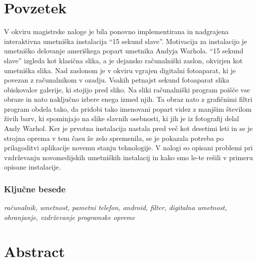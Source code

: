 \documentclass[a4paper, 12pt]{book}
\begin{document}
	
\chapter{Povzetek}

V okviru magistrske naloge je bila ponovno implementirana in nadgrajena
interaktivna umetniška instalacija ``15 sekund slave''. Motivacija za
instalacijo je umetniško delovanje ameriškega popart umetnika Andyja Warhola.
``15 sekund slave'' izgleda kot klasična slika, a je dejansko računalniški
zaslon, okvirjen kot umetniška slika. Nad zaslonom je v okviru vgrajen
digitalni fotoaparat, ki je povezan z računalnikom v ozadju. Vsakih petnajst
sekund fotoaparat slika obiskovalce galerije, ki stojijo pred sliko. Na sliki
računalniški program poišče vse obraze in nato naključno izbere enega izmed
njih. Ta obraz nato z grafičnimi filtri program obdela tako, da pridobi tako
imenovani popart videz z manjšim številom živih barv, ki spominjajo na
slike slavnih osebnosti, ki jih je iz fotografij delal Andy Warhol. Ker je
prvotna instalacija nastala pred več kot desetimi leti in se je strojna oprema v
tem času že zelo spremenila, se je pokazala potreba po prilagoditvi aplikacije
novemu stanju tehnologije. V nalogi so opisani problemi pri vzdrževanju
novomedijskih umetniških instalacij in kako smo le-te rešili v primeru opisane
instalacije.

\subsection*{Ključne besede}
\textit{računalnik, umetnost, pametni telefon, android, filter, digitalna umetnost, ohranjanje, vzdrževanje programske opreme}
\clearemptydoublepage



\chapter{Abstract}
\end{document}
